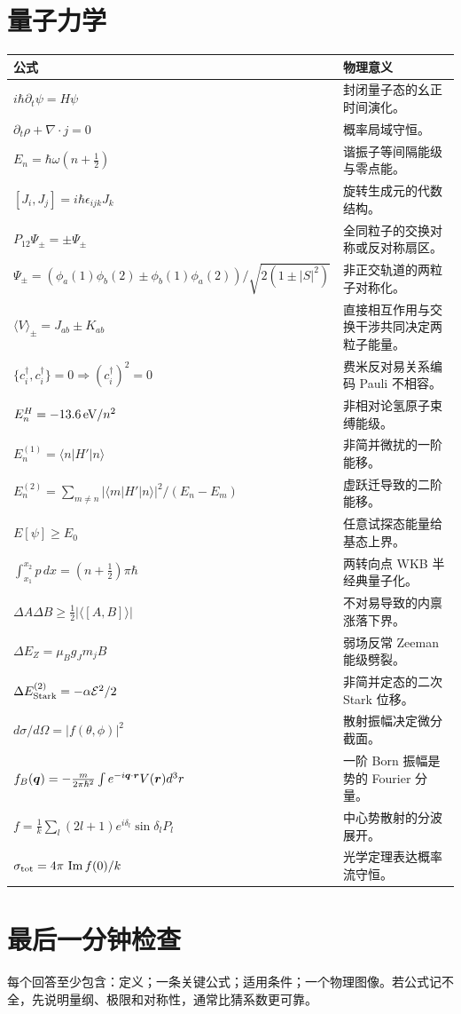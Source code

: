 \section{量子力学}
\begin{longtable}{p{}p{}}\toprule
公式&物理意义\\\midrule\endhead
$i\hbar\partial_t\psi=H\psi$&封闭量子态的幺正时间演化。\\
$\partial_t\rho+\nabla\cdot j=0$&概率局域守恒。\\
$E_n=\hbar\omega(n+\frac12)$&谐振子等间隔能级与零点能。\\
$[J_i,J_j]=i\hbar\epsilon_{ijk}J_k$&旋转生成元的代数结构。\\
$P_{12}\Psi_\pm=\pm\Psi_\pm$&全同粒子的交换对称或反对称扇区。\\
$\Psi_\pm=(\phi_a(1)\phi_b(2)\pm\phi_b(1)\phi_a(2))/\sqrt{2(1\pm|S|^2)}$&非正交轨道的两粒子对称化。\\
$\langle V\rangle_\pm=J_{ab}\pm K_{ab}$&直接相互作用与交换干涉共同决定两粒子能量。\\
$\{c_i^\dagger,c_i^\dagger\}=0\Rightarrow(c_i^\dagger)^2=0$&费米反对易关系编码 Pauli 不相容。\\
$E_n^{H}=-13.6\,{\rm eV}/n^2$&非相对论氢原子束缚能级。\\
$E_n^{(1)}=\langle n|H'|n\rangle$&非简并微扰的一阶能移。\\
$E_n^{(2)}=\sum_{m\ne n}|\langle m|H'|n\rangle|^2/(E_n-E_m)$&虚跃迁导致的二阶能移。\\
$E[\psi]\ge E_0$&任意试探态能量给基态上界。\\
$\int_{x_1}^{x_2}p\,dx=(n+\frac12)\pi\hbar$&两转向点 WKB 半经典量子化。\\
$\Delta A\Delta B\ge\frac12|\langle[A,B]\rangle|$&不对易导致的内禀涨落下界。\\
$\Delta E_Z=\mu_Bg_Jm_jB$&弱场反常 Zeeman 能级劈裂。\\
$\Delta E_{\rm Stark}^{(2)}=-\alpha\mathcal E^2/2$&非简并定态的二次 Stark 位移。\\
$d\sigma/d\Omega=|f(\theta,\phi)|^2$&散射振幅决定微分截面。\\
$f_B(\bm{q})=-\frac{m}{2\pi\hbar^2}\int e^{-i\bm{q}\cdot\bm{r}}V(\bm{r})d^3r$&一阶 Born 振幅是势的 Fourier 分量。\\
$f=\frac1k\sum_l(2l+1)e^{i\delta_l}\sin\delta_lP_l$&中心势散射的分波展开。\\
$\sigma_{\rm tot}=4\pi\,\operatorname{Im}f(0)/k$&光学定理表达概率流守恒。\\\bottomrule
\end{longtable}
\normalsize

\section{最后一分钟检查}
每个回答至少包含：定义；一条关键公式；适用条件；一个物理图像。若公式记不全，先说明量纲、极限和对称性，通常比猜系数更可靠。
